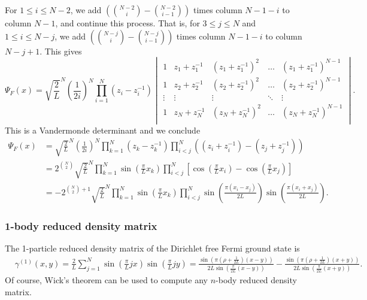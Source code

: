 \documentclass[a4paper,11pt]{article}
\numberwithin{equation}{section}
\begin{document}
	For $1\leq i\leq N-2 $, we add $ \left(\binom{N-2}{i}-\binom{N-2}{i-1}\right) $ times column $ N-1-i $ to column $ N-1 $, and continue this process. That is, for $3\leq j\leq N$ and $1\leq i\leq N-j $, we add  $ \left(\binom{N-j}{i}-\binom{N-j}{i-1}\right) $ times column $ N-1-i $ to column $ N-j+1 $. This gives \begin{equation}
	\Psi_F(x)=\sqrt{\frac{2}{L}}^N\left(\frac{1}{2i}\right)^N\prod_{i=1}^{N}(z_i-z_i^{-1})\begin{vmatrix}
	1&z_1+z_1^{-1}&(z_1+z_1^{-1})^2&\ldots&(z_1+z_1^{-1})^{N-1}\\
	1&z_2+z_2^{-1}&(z_2+z_2^{-1})^2&\ldots&(z_2+z_2^{-1})^{N-1}\\
	\vdots&\vdots&\vdots&\ddots&\vdots\\
	1&z_N+z_N^{-1}&(z_N+z_N^{-1})^2&\ldots&(z_N+z_N^{-1})^{N-1}\\
	\end{vmatrix}.
	\end{equation}
	This is a Vandermonde determinant and we conclude \begin{equation}
	\begin{aligned}
	\Psi_F(x)&=\sqrt{\frac{2}{L}}^N\left(\frac{1}{2i}\right)^N\prod_{k=1}^{N}(z_k-z_k^{-1})\prod_{i<j}^{N}\left((z_i+z_i^{-1})-(z_j+z_j^{-1})\right)\\
	&=2^{\binom{N}{2}}\sqrt{\frac{2}{L}}^N\prod_{k=1}^{N}\sin\left(\frac{\pi}{L}x_k\right)\prod_{i<j}^{N}\left[\cos\left(\frac{\pi}{L}x_i\right)-\cos\left(\frac{\pi}{L}x_j\right)\right]\\
	&=-2^{\binom{N}{2}+1}\sqrt{\frac{2}{L}}^N\prod_{k=1}^{N}\sin\left(\frac{\pi}{L}x_k\right)\prod_{i<j}^{N}\sin\left(\frac{\pi(x_i-x_j)}{2L}\right)\sin\left(\frac{\pi(x_i+x_j)}{2L}\right)
	.
	\end{aligned}
	\end{equation}
	
	\subsubsection{1-body reduced density matrix}
	The 1-particle reduced density matrix of the Dirichlet free Fermi ground state is
	\begin{equation}
	\begin{aligned}
	&\gamma^{(1)}(x,y)=\frac{2}{L}\sum_{j=1}^{N}\sin\left(\frac{\pi}{L}jx\right)\sin\left(\frac{\pi}{L} jy\right)=\frac{\sin\left(\pi\left(\rho+\frac{1}{2L}\right)(x-y)\right)}{2L\sin\left(\frac{\pi}{2L}(x-y)\right)}-\frac{\sin\left(\pi\left(\rho+\frac{1}{2L}\right)(x+y)\right)}{2L\sin\left(\frac{\pi}{2L}(x+y)\right)}.
	\end{aligned}
	\end{equation}
	Of course, Wick's theorem can be used to compute any $n$-body reduced density matrix.
\end{document}
